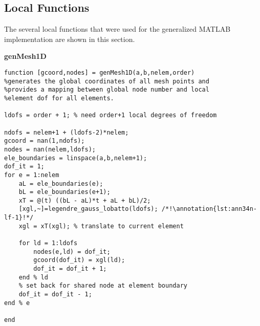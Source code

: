 \subsection{Local Functions}
The several local functions that were used for the generalized MATLAB implementation are shown in this section.

\vspace{0.25cm}

\setcounter{lstannotation}{0}

\noindent\textbf{genMesh1D}

\begin{lstlisting}[style=myMatlab,name=lec34n-ex2]
function [gcoord,nodes] = genMesh1D(a,b,nelem,order)
%generates the global coordinates of all mesh points and 
%provides a mapping between global node number and local
%element dof for all elements.

ldofs = order + 1; % need order+1 local degrees of freedom

ndofs = nelem+1 + (ldofs-2)*nelem;
gcoord = nan(1,ndofs);
nodes = nan(nelem,ldofs);
ele_boundaries = linspace(a,b,nelem+1);
dof_it = 1;
for e = 1:nelem 
    aL = ele_boundaries(e);
    bL = ele_boundaries(e+1);
    xT = @(t) ((bL - aL)*t + aL + bL)/2;
    [xgl,~]=legendre_gauss_lobatto(ldofs); /*!\annotation{lst:ann34n-lf-1}!*/
    xgl = xT(xgl); % translate to current element

    for ld = 1:ldofs
        nodes(e,ld) = dof_it;
        gcoord(dof_it) = xgl(ld);
        dof_it = dof_it + 1;
    end % ld
    % set back for shared node at element boundary
    dof_it = dof_it - 1; 
end % e

end
\end{lstlisting}

\vspace{0.25cm}


